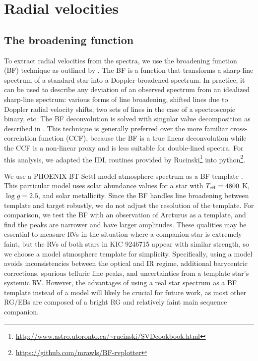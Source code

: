 \section{Radial velocities}\label{rvs}
\subsection{The broadening function}\label{bf}
To extract radial velocities from the spectra, we use the broadening function (BF) technique as outlined by \citet{ruc02}. The BF is a function that transforms a sharp-line spectrum of a standard star into a Doppler-broadened spectrum. In practice, it can be used to describe any deviation of an observed spectrum from an idealized sharp-line spectrum: various forms of line broadening, shifted lines due to Doppler radial velocity shifts, two sets of lines in the case of a spectroscopic binary, etc. The BF deconvolution is solved with singular value decomposition as described in \citet{ruc02}. This technique is generally preferred over the more familiar cross-correlation function (CCF), because the BF is a true linear deconvolution while the CCF is a non-linear proxy and is less suitable for double-lined spectra. For this analysis, we adapted the IDL routines provided by Rucinski\footnote{\url{http://www.astro.utoronto.ca/~rucinski/SVDcookbook.html}} into python\footnote{\url{https://github.com/mrawls/BF-rvplotter}}.

We use a PHOENIX BT-Settl model atmosphere spectrum as a BF template \citep{all03}. This particular model uses \citet{Asplund_2009} solar abundance values for a star with $T_{\rm{eff}} = 4800$ K, $\log g = 2.5$, and solar metallicity. Since the BF handles line broadening between template and target robustly, we do not adjust the resolution of the template. For comparison, we test the BF with an observation of Arcturus as a template, and find the peaks are narrower and have larger amplitudes. These qualities may be essential to measure RVs in the situation where a companion star is extremely faint, but the RVs of both stars in KIC 9246715 appear with similar strength, so we choose a model atmosphere template for simplicity. Specifically, using a model avoids inconsistencies between the optical and IR regime, additional barycentric corrections, spurious telluric line peaks, and uncertainties from a template star's systemic RV. However, the advantages of using a real star spectrum as a BF template instead of a model will likely be crucial for future work, as most other RG/EBs are composed of a bright RG and relatively faint main sequence companion.

